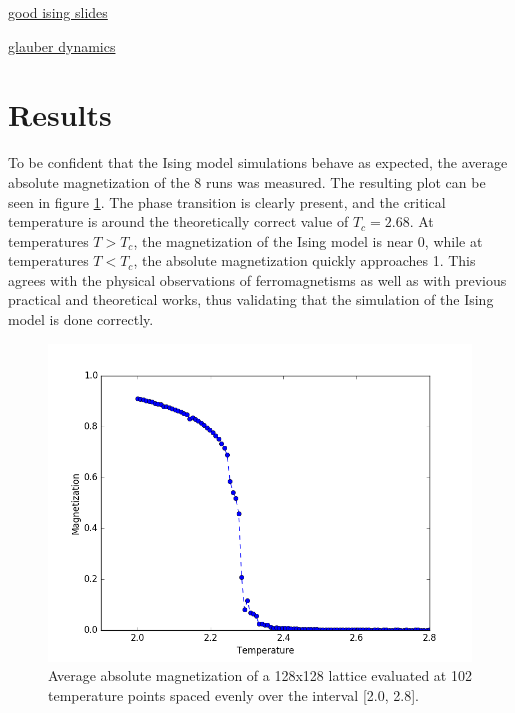 \documentclass[12pt]{article}
\begin{document}
\href{http://web.mit.edu/krish_s/www/files/ising_Model.pdf}{good ising slides}

\href{http://www.hermetic.ch/compsci/thesis/contents.htm}{glauber dynamics}

\newpage
\section{Results}

To be confident that the Ising model simulations behave as expected, the average absolute magnetization of the 8 runs was measured. The resulting plot can be seen in figure \ref{fig:ising-128-mags}. The phase transition is clearly present, and the critical temperature is around the theoretically correct value of $T_c = 2.68$. At temperatures $T > T_c$, the magnetization of the Ising model is near 0, while at temperatures $T < T_c$, the absolute magnetization quickly approaches 1. This agrees with the physical observations of ferromagnetisms as well as with previous practical and theoretical works, thus validating that the simulation of the Ising model is done correctly. 

\begin{figure} [h!]
\begin{center}
\includegraphics[width=\textwidth]{ising-128-mags}
\caption{Average absolute magnetization of a 128x128 lattice evaluated at 102 temperature points spaced evenly over the interval [2.0, 2.8].}
\label{fig:ising-128-mags}
\end{center}
\end{figure}
\end{document}
